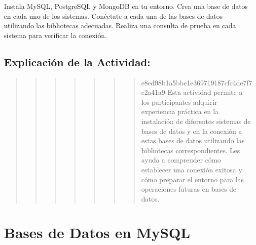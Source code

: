 \documentclass[
  a4paper,
  DIV=11,
  numbers=noendperiod,
  onepage,
  openany]{scrreprt}
\begin{document}
\begin{tcolorbox}[enhanced jigsaw, colbacktitle=quarto-callout-important-color!10!white, toprule=.15mm, leftrule=.75mm, titlerule=0mm, opacityback=0, rightrule=.15mm, opacitybacktitle=0.6, breakable, left=2mm, coltitle=black, title=\textcolor{quarto-callout-important-color}{\faExclamation}\hspace{0.5em}{Actividad Práctica:}, toptitle=1mm, bottomtitle=1mm, arc=.35mm, bottomrule=.15mm, colback=white, colframe=quarto-callout-important-color-frame]

Instala MySQL, PostgreSQL y MongoDB en tu entorno. Crea una base de
datos en cada uno de los sistemas. Conéctate a cada una de las bases de
datos utilizando las bibliotecas adecuadas. Realiza una consulta de
prueba en cada sistema para verificar la conexión.

\end{tcolorbox}

\hypertarget{explicaciuxf3n-de-la-actividad-71}{%
\section{Explicación de la
Actividad:}\label{explicaciuxf3n-de-la-actividad-71}}

\begin{quote}
\begin{quote}
\begin{quote}
\begin{quote}
\begin{quote}
\begin{quote}
\begin{quote}
e8ed08b1a5bbe1e369719187cfc4de7f7e2a41a9 Esta actividad permite a los
participantes adquirir experiencia práctica en la instalación de
diferentes sistemas de bases de datos y en la conexión a estas bases de
datos utilizando las bibliotecas correspondientes. Les ayuda a
comprender cómo establecer una conexión exitosa y cómo preparar el
entorno para las operaciones futuras en bases de datos.
\end{quote}
\end{quote}
\end{quote}
\end{quote}
\end{quote}
\end{quote}
\end{quote}

\hypertarget{bases-de-datos-en-mysql}{%
\chapter{Bases de Datos en MySQL}\label{bases-de-datos-en-mysql}}
\end{document}
